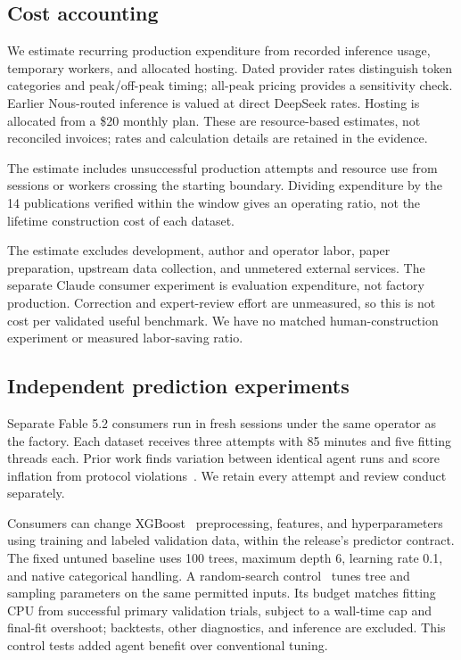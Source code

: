 \documentclass[conference,10pt,letterpaper]{IEEEtran}
\begin{document}
\subsection{Cost accounting}
We estimate recurring production expenditure from recorded inference usage, temporary workers, and allocated hosting. Dated provider rates distinguish token categories and peak/off-peak timing; all-peak pricing provides a sensitivity check. Earlier Nous-routed inference is valued at direct DeepSeek rates. Hosting is allocated from a \$20 monthly plan. These are resource-based estimates, not reconciled invoices; rates and calculation details are retained in the evidence.

The estimate includes unsuccessful production attempts and resource use from sessions or workers crossing the starting boundary. Dividing expenditure by the 14 publications verified within the window gives an operating ratio, not the lifetime construction cost of each dataset.

The estimate excludes development, author and operator labor, paper preparation, upstream data collection, and unmetered external services. The separate Claude consumer experiment is evaluation expenditure, not factory production. Correction and expert-review effort are unmeasured, so this is not cost per validated useful benchmark. We have no matched human-construction experiment or measured labor-saving ratio.

\subsection{Independent prediction experiments}
Separate Fable 5.2 consumers run in fresh sessions under the same operator as the factory. Each dataset receives three attempts with 85 minutes and five fitting threads each. Prior work finds variation between identical agent runs and score inflation from protocol violations~\cite{identical-runs}. We retain every attempt and review conduct separately.

Consumers can change XGBoost~\cite{xgboost} preprocessing, features, and hyperparameters using training and labeled validation data, within the release's predictor contract. The fixed untuned baseline uses 100 trees, maximum depth 6, learning rate 0.1, and native categorical handling. A random-search control~\cite{randomsearch} tunes tree and sampling parameters on the same permitted inputs. Its budget matches fitting CPU from successful primary validation trials, subject to a wall-time cap and final-fit overshoot; backtests, other diagnostics, and inference are excluded. This control tests added agent benefit over conventional tuning.
\end{document}
